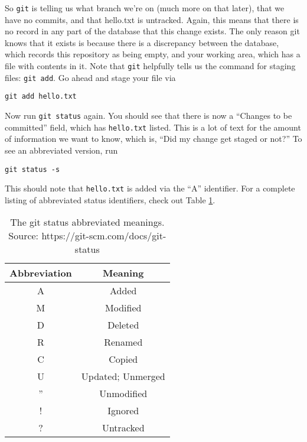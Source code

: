 \par{
So \verb+git+ is telling us what branch we're on (much more on that later),
that we have no commits, and that hello.txt is untracked. Again, this means
that there is no record in any part of the database that this change exists.
The only reason git knows that it exists is because there is a discrepancy
between the database, which records this repository as being empty, and your
working area, which has a file with contents in it. Note that \verb+git+
helpfully tells us the command for staging files: \verb+git add+. Go ahead and
stage your file via
}

\begin{verbatim}
git add hello.txt
\end{verbatim}

\par{
Now run \verb+git status+ again. 
You should see that there is now a ``Changes to be
committed'' field, which has \verb+hello.txt+ listed. 
This is a lot of text for the amount of information we want to know, which is,
``Did my change get staged or not?'' To see an abbreviated version, run 
}

\begin{verbatim}
git status -s
\end{verbatim}

\par{
This should note that \verb+hello.txt+ is added via the ``A'' identifier. For
a complete listing of abbreviated status identifiers, check out Table
\ref{tbl:status}.
}

\begin{table}
\centering
\begin{tabular}{c | c}
\hline
\hline
Abbreviation & Meaning \\
\hline
A & Added \\
M & Modified \\
D & Deleted \\
R & Renamed \\
C & Copied \\
U & Updated; Unmerged \\
'' & Unmodified \\
! & Ignored \\
? & Untracked \\
\hline
\hline
\end{tabular}
\caption{The git status abbreviated meanings. Source: https://git-scm.com/docs/git-status}
\label{tbl:status}
\end{table}

